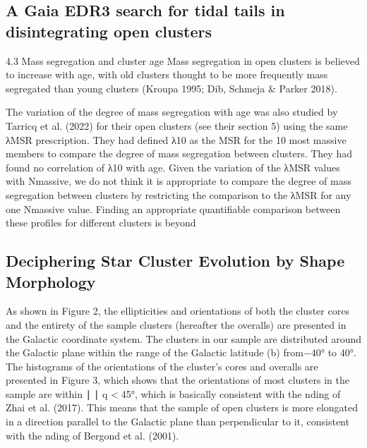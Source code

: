 \documentclass[../main.tex]{subfiles}
\begin{document}
{\subsection{A Gaia EDR3 search for tidal tails in disintegrating open clusters}

4.3 Mass segregation and cluster age
Mass segregation in open clusters is believed to increase with age,
with old clusters thought to be more frequently mass segregated than
young clusters (Kroupa 1995; Dib, Schmeja & Parker 2018).

The variation of the degree of mass segregation with age was also
studied by Tarricq et al. (2022) for their open clusters (see their
section 5) using the same λMSR prescription. They had defined λ10
as the MSR for the 10 most massive members to compare the degree
of mass segregation between clusters. They had found no correlation
of λ10 with age. Given the variation of the λMSR values with Nmassive,
we do not think it is appropriate to compare the degree of mass
segregation between clusters by restricting the comparison to the
λMSR for any one Nmassive value. Finding an appropriate quantifiable
comparison between these profiles for different clusters is beyond

\subsection{Deciphering Star Cluster Evolution by Shape Morphology}

As shown in Figure 2, the ellipticities and orientations of both
the cluster cores and the entirety of the sample clusters (hereafter
the overalls) are presented in the Galactic coordinate system. The
clusters in our sample are distributed around the Galactic plane
within the range of the Galactic latitude (b) from−40° to 40°. The
histograms of the orientations of the cluster’s cores and overalls
are presented in Figure 3, which shows that the orientations of
most clusters in the sample are within ∣ ∣ q <45°, which is basically
consistent with the nding of Zhai et al. (2017). This means that
the sample of open clusters is more elongated in a direction
parallel to the Galactic plane than perpendicular to it, consistent
with the nding of Bergond et al. (2001).

}
\end{document}
